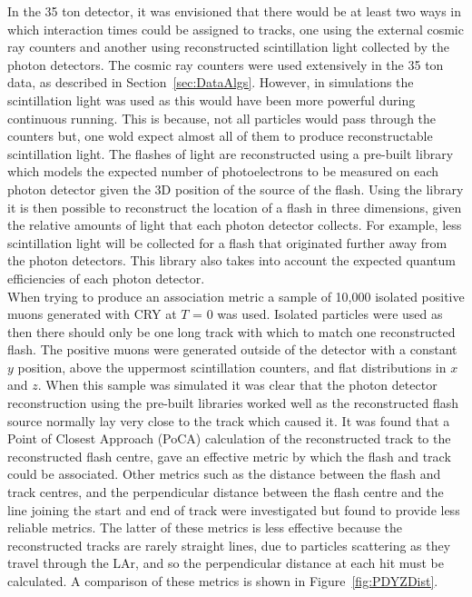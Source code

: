 In the 35 ton detector, it was envisioned that there would be at least two ways in which interaction times could be assigned to tracks, one using the external cosmic ray counters and another using reconstructed scintillation light collected by the photon detectors. The cosmic ray counters were used extensively in the 35 ton data, as described in Section~\ref{sec:DataAlgs}. However, in simulations the scintillation light was used as this would have been more powerful during continuous running. This is because, not all particles would pass through the counters but, one wold expect almost all of them to produce reconstructable scintillation light. The flashes of light are reconstructed using a pre-built library which models the expected number of photoelectrons to be measured on each photon detector given the 3D position of the source of the flash. Using the library it is then possible to reconstruct the location of a flash in three dimensions, given the relative amounts of light that each photon detector collects. For example, less scintillation light will be collected for a flash that originated further away from the photon detectors. This library also takes into account the expected quantum efficiencies of each photon detector. \\

When trying to produce an association metric a sample of 10,000 isolated positive muons generated with CRY at $T$ = 0 was used. Isolated particles were used as then there should only be one long track with which to match one reconstructed flash. The positive muons were generated outside of the detector with a constant $y$ position, above the uppermost scintillation counters, and flat distributions in $x$ and $z$. When this sample was simulated it was clear that the photon detector reconstruction using the pre-built libraries worked well as the reconstructed flash source normally lay very close to the track which caused it. It was found that a Point of Closest Approach (PoCA) calculation of the reconstructed track to the reconstructed flash centre, gave an effective metric by which the flash and track could be associated. Other metrics such as the distance between the flash and track centres, and the perpendicular distance between the flash centre and the line joining the start and end of track were investigated but found to provide less reliable metrics. The latter of these metrics is less effective because the reconstructed tracks are rarely straight lines, due to particles scattering as they travel through the LAr, and so the perpendicular distance at each hit must be calculated. A comparison of these metrics is shown in Figure~\ref{fig:PDYZDist}. \\

